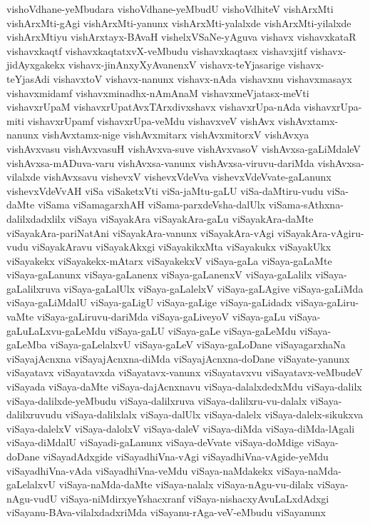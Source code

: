 {vishoVdhane-yeMbudara
vishoVdhane-yeMbudU
vishoVdhiteV
vishArxMti
vishArxMti-gAgi
vishArxMti-yanunx
vishArxMti-yalalxde
vishArxMti-yilalxde
vishArxMtiyu
vishArxtayx-BAvaH
vishelxVSaNe-yAguva
vishavx
vishavxkataR
vishavxkaqtf
vishavxkaqtatxvX-veMbudu
vishavxkaqtasx
vishavxjitf
vishavx-jidAyxgakekx
vishavx-jinAnxyXyAvanenxV
vishavx-teYjasarige
vishavx-teYjasAdi
vishavxtoV
vishavx-nanunx
vishavx-nAda
vishavxnu
vishavxmasayx
vishavxmidamf
vishavxminadhx-nAmAnaM
vishavxmeVjatasx-meVti
vishavxrUpaM
vishavxrUpatAvxTArxdivxshavx
vishavxrUpa-nAda
vishavxrUpa-miti
vishavxrUpamf
vishavxrUpa-veMdu
vishavxveV
vishAvx
vishAvxtamx-nanunx
vishAvxtamx-nige
vishAvxmitarx
vishAvxmitorxV
vishAvxya
vishAvxvasu
vishAvxvasuH
vishAvxva-suve
vishAvxvasoV
vishAvxsa-gaLiMdaleV
vishAvxsa-mADuva-varu
vishAvxsa-vanunx
vishAvxsa-viruvu-dariMda
vishAvxsa-vilalxde
vishAvxsavu
vishevxV
vishevxVdeVva
vishevxVdeVvate-gaLanunx
vishevxVdeVvAH
viSa
viSaketxVti
viSa-jaMtu-gaLU
viSa-daMtiru-vudu
viSa-daMte
viSama
viSamagarxhAH
viSama-parxdeVsha-dalUlx
viSama-sAthxna-dalilxdadxlilx
viSaya
viSayakAra
viSayakAra-gaLu
viSayakAra-daMte
viSayakAra-pariNatAni
viSayakAra-vanunx
viSayakAra-vAgi
viSayakAra-vAgiru-vudu
viSayakAravu
viSayakAkxgi
viSayakikxMta
viSayakukx
viSayakUkx
viSayakekx
viSayakekx-mAtarx
viSayakekxV
viSaya-gaLa
viSaya-gaLaMte
viSaya-gaLanunx
viSaya-gaLanenx
viSaya-gaLanenxV
viSaya-gaLalilx
viSaya-gaLalilxruva
viSaya-gaLalUlx
viSaya-gaLalelxV
viSaya-gaLAgive
viSaya-gaLiMda
viSaya-gaLiMdalU
viSaya-gaLigU
viSaya-gaLige
viSaya-gaLidadx
viSaya-gaLiru-vaMte
viSaya-gaLiruvu-dariMda
viSaya-gaLiveyoV
viSaya-gaLu
viSaya-gaLuLaLxvu-gaLeMdu
viSaya-gaLU
viSaya-gaLe
viSaya-gaLeMdu
viSaya-gaLeMba
viSaya-gaLelalxvU
viSaya-gaLeV
viSaya-gaLoDane
viSayagarxhaNa
viSayajAcnxna
viSayajAcnxna-diMda
viSayajAcnxna-doDane
viSayate-yanunx
viSayatavx
viSayatavxda
viSayatavx-vanunx
viSayatavxvu
viSayatavx-veMbudeV
viSayada
viSaya-daMte
viSaya-dajAcnxnavu
viSaya-dalalxdedxMdu
viSaya-dalilx
viSaya-dalilxde-yeMbudu
viSaya-dalilxruva
viSaya-dalilxru-vu-dalalx
viSaya-dalilxruvudu
viSaya-dalilxlalx
viSaya-dalUlx
viSaya-dalelx
viSaya-dalelx-sikukxva
viSaya-dalelxV
viSaya-dalolxV
viSaya-daleV
viSaya-diMda
viSaya-diMda-lAgali
viSaya-diMdalU
viSayadi-gaLanunx
viSaya-deVvate
viSaya-doMdige
viSaya-doDane
viSayadAdxgide
viSayadhiVna-vAgi
viSayadhiVna-vAgide-yeMdu
viSayadhiVna-vAda
viSayadhiVna-veMdu
viSaya-naMdakekx
viSaya-naMda-gaLelalxvU
viSaya-naMda-daMte
viSaya-nalalx
viSaya-nAgu-vu-dilalx
viSaya-nAgu-vudU
viSaya-niMdirxyeYshacxranf
viSaya-nishacxyAvuLaLxdAdxgi
viSayanu-BAva-vilalxdadxriMda
viSayanu-rAga-veV-eMbudu
viSayanunx
}

